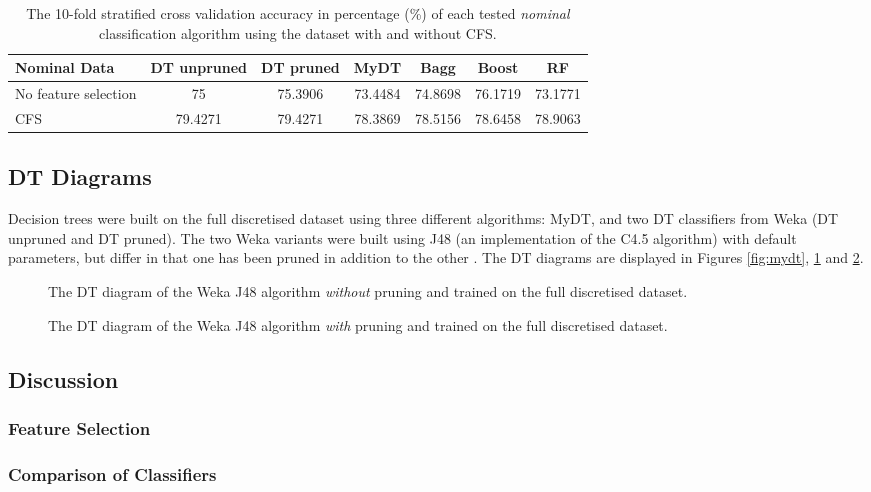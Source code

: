 \begin{table}[h!]
    \caption{The 10-fold stratified cross validation accuracy in percentage (\%) of each tested \textit{nominal} classification algorithm using the dataset with and without CFS. \label{tab:acc:nom}}
    \begin{center}
    \begin{tabular}{|m{2cm}*{6}{|c}|}
        \hline
        \textbf{Nominal Data} & DT unpruned &DT pruned &\color{blue}MyDT &Bagg &Boost &RF \\
        \hline
        No feature selection &75 & 75.3906 &73.4484 &74.8698&76.1719&73.1771 \\
        \hline
        CFS & 79.4271 & 79.4271 &78.3869 & 78.5156 & 78.6458 & 78.9063 \\
        \hline
    \end{tabular}
    \end{center}
\end{table}

\subsection{DT Diagrams}
Decision trees were built on the full discretised dataset using three different algorithms: MyDT, and two DT classifiers from Weka (DT unpruned and DT pruned). The two Weka variants were built using J48 (an implementation of the C4.5 algorithm) with default parameters, but differ in that one has been pruned in addition to the other \cite{weka}. The DT diagrams are displayed in Figures \ref{fig:mydt}, \ref{fig:dt_unprune} and \ref{fig:dt_prune}.

\begin{figure}[h!]
    \begin{obeylines}
        
    \end{obeylines}
    \caption{The DT diagram of the Weka J48 algorithm \textit{without} pruning and trained on the full discretised dataset.\label{fig:dt_unprune}}
\end{figure}

\begin{figure}[h!]
    \begin{obeylines}
        
    \end{obeylines}
    \caption{The DT diagram of the Weka J48 algorithm \textit{with} pruning and trained on the full discretised dataset.\label{fig:dt_prune}}
\end{figure}

\subsection{Discussion}

\subsubsection{Feature Selection}

\subsubsection{Comparison of Classifiers}
